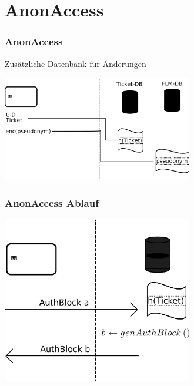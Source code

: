 \section{AnonAccess}


\begin{frame}
	\frametitle{AnonAccess}
	Zusätzliche Datenbank für Änderungen
	\begin{center}\includegraphics[width=8.3cm]{ansatz3.png}\end{center}
\end{frame}


\begin{frame}
	\frametitle{AnonAccess Ablauf}
	\begin{center}\includegraphics[width=8.3cm]{ansatz3ablauf.png}\end{center}
\end{frame}


